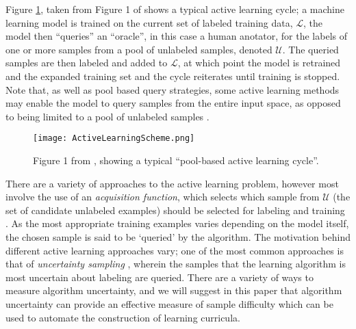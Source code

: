 Figure \ref{ActiveLearningExample}, taken from Figure 1 of \cite{settles2012active} shows a typical active learning cycle; a machine learning model is trained on the current set of labeled training data, $\mathcal{L}$, the model then ``queries'' an ``oracle'', in this case a human anotator, for the labels of one or more samples from a pool of unlabeled  samples, denoted $\mathcal{U}$. The queried samples are then labeled and added to $\mathcal{L}$, at which point the model is retrained and the expanded training set and the cycle reiterates until training is stopped. Note that, as well as pool based query strategies, some active learning methods may enable the model to query samples from the entire input space, as opposed to being limited to a pool of unlabeled samples \cite{settles2012active}.

\begin{figure}[h!]
\centering
\texttt{[image: ActiveLearningScheme.png]}
\caption{Figure 1 from  \cite{settles2012active}, showing a typical ``pool-based active learning cycle''.}
\label{ActiveLearningExample}
\end{figure}

There are a variety of approaches to the active learning problem, however most involve the use of an \textit{acquisition function}, which selects which sample from $\mathcal{U}$ (the set of candidate unlabeled examples) should be selected for labeling and training \cite{settles2012active}. As the most appropriate training examples varies depending on the model itself, the chosen sample is said to be `queried' by the algorithm. The motivation behind different active learning approaches vary; one of the most common approaches is that of \textit{uncertainty sampling} \cite{settles2012active}, wherein the samples that the learning algorithm is most uncertain about labeling are queried. There are a variety of ways to measure algorithm uncertainty, and we will suggest in this paper that algorithm uncertainty can provide an effective measure of sample difficulty which can be used to automate the construction of learning curricula. 

